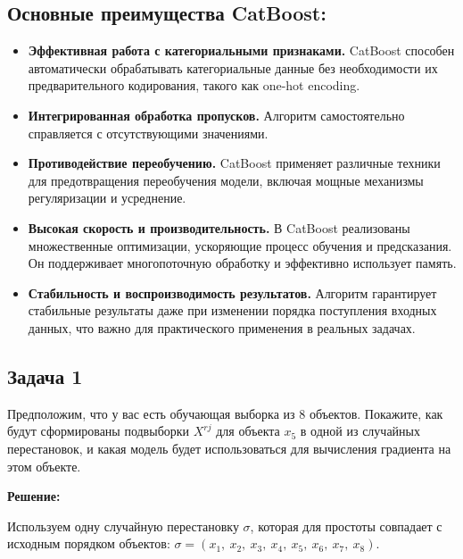 \subsection*{Основные преимущества CatBoost:}

\begin{itemize}
    \item \textbf{Эффективная работа с категориальными признаками.} CatBoost способен автоматически обрабатывать категориальные данные без необходимости их предварительного кодирования, такого как one-hot encoding.

    \item \textbf{Интегрированная обработка пропусков.} Алгоритм самостоятельно справляется с отсутствующими значениями.
    \item \textbf{Противодействие переобучению.} CatBoost применяет различные техники для предотвращения переобучения модели, включая мощные механизмы регуляризации и усреднение.

    \item \textbf{Высокая скорость и производительность.} В CatBoost реализованы множественные оптимизации, ускоряющие процесс обучения и предсказания. Он поддерживает многопоточную обработку и эффективно использует память.

    \item \textbf{Стабильность и воспроизводимость результатов.} Алгоритм гарантирует стабильные результаты даже при изменении порядка поступления входных данных, что важно для практического применения в реальных задачах.

\end{itemize}

\subsection*{Задача 1}

Предположим, что у вас есть обучающая выборка из 8 объектов. Покажите, как будут сформированы подвыборки $X^{rj} $ для объекта $x_5$ в одной из случайных перестановок, и какая модель будет использоваться для вычисления градиента на этом объекте.

\textbf{Решение:}

Используем одну случайную перестановку $\sigma$, которая для простоты совпадает с исходным порядком объектов: $\sigma = \left( x_1, \ x_2, \ x_3, \ x_4, \ x_5, \ x_6, \ x_7, \ x_8 \right)$.

